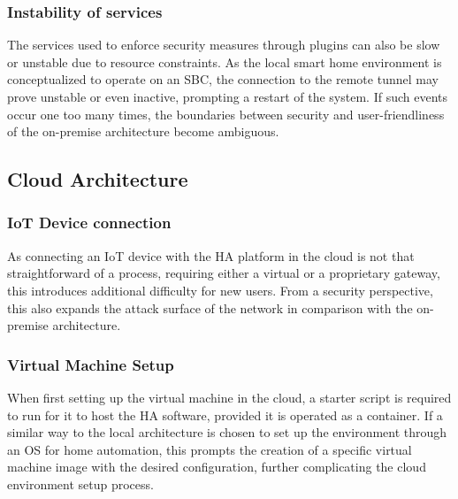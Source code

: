 \subsubsection{Instability of services}
The services used to enforce security measures through plugins can also be slow or unstable due to resource constraints. As the local smart home environment is conceptualized to operate on an SBC, the connection to the remote tunnel may prove unstable or even inactive, prompting a restart of the system. If such events occur one too many times, the boundaries between security and user-friendliness of the on-premise architecture become ambiguous.

\subsection{Cloud Architecture}
\subsubsection{IoT Device connection}
As connecting an IoT device with the HA platform in the cloud is not that straightforward of a process, requiring either a virtual or a proprietary gateway, this introduces additional difficulty for new users. From a security perspective, this also expands the attack surface of the network in comparison with the on-premise architecture.

\subsubsection{Virtual Machine Setup}
When first setting up the virtual machine in the cloud, a starter script is required to run for it to host the HA software, provided it is operated as a container. If a similar way to the local architecture is chosen to set up the environment through an OS for home automation, this prompts the creation of a specific virtual machine image with the desired configuration, further complicating the cloud environment setup process.